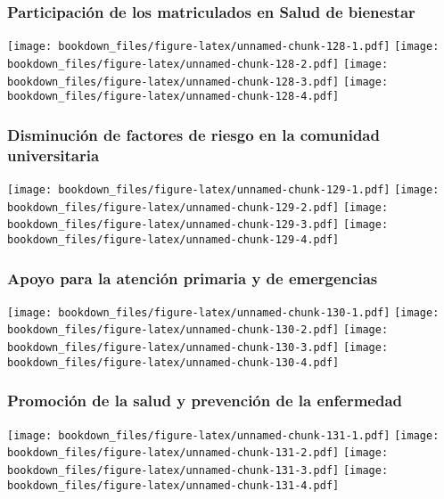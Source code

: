 \documentclass[]{article}
\theoremstyle{definition}
\theoremstyle{definition}
\theoremstyle{definition}
\theoremstyle{remark}
\begin{document}
\subsubsection{Participación de los matriculados en Salud de
bienestar}\label{participacion-de-los-matriculados-en-salud-de-bienestar}

\texttt{[image: bookdown\_files/figure-latex/unnamed-chunk-128-1.pdf]}
\texttt{[image: bookdown\_files/figure-latex/unnamed-chunk-128-2.pdf]}
\texttt{[image: bookdown\_files/figure-latex/unnamed-chunk-128-3.pdf]}
\texttt{[image: bookdown\_files/figure-latex/unnamed-chunk-128-4.pdf]}

\subsubsection{Disminución de factores de riesgo en la comunidad
universitaria}\label{disminucion-de-factores-de-riesgo-en-la-comunidad-universitaria}

\texttt{[image: bookdown\_files/figure-latex/unnamed-chunk-129-1.pdf]}
\texttt{[image: bookdown\_files/figure-latex/unnamed-chunk-129-2.pdf]}
\texttt{[image: bookdown\_files/figure-latex/unnamed-chunk-129-3.pdf]}
\texttt{[image: bookdown\_files/figure-latex/unnamed-chunk-129-4.pdf]}

\subsubsection{Apoyo para la atención primaria y de
emergencias}\label{apoyo-para-la-atencion-primaria-y-de-emergencias}

\texttt{[image: bookdown\_files/figure-latex/unnamed-chunk-130-1.pdf]}
\texttt{[image: bookdown\_files/figure-latex/unnamed-chunk-130-2.pdf]}
\texttt{[image: bookdown\_files/figure-latex/unnamed-chunk-130-3.pdf]}
\texttt{[image: bookdown\_files/figure-latex/unnamed-chunk-130-4.pdf]}

\subsubsection{Promoción de la salud y prevención de la
enfermedad}\label{promocion-de-la-salud-y-prevencion-de-la-enfermedad}

\texttt{[image: bookdown\_files/figure-latex/unnamed-chunk-131-1.pdf]}
\texttt{[image: bookdown\_files/figure-latex/unnamed-chunk-131-2.pdf]}
\texttt{[image: bookdown\_files/figure-latex/unnamed-chunk-131-3.pdf]}
\texttt{[image: bookdown\_files/figure-latex/unnamed-chunk-131-4.pdf]}
\end{document}
